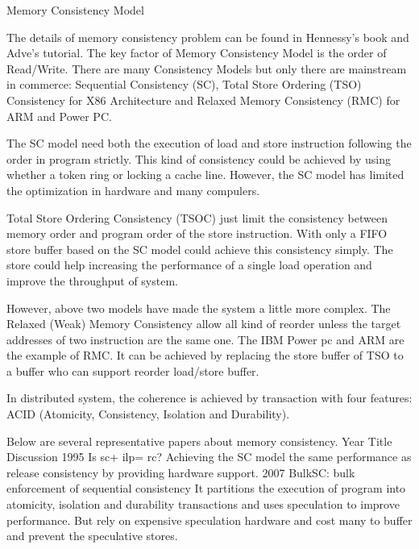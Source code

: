 \par Memory Consistency Model
\par The details of memory consistency problem can be found in Hennessy's book\cite{hennessy2017computer} and Adve's tutorial\cite{adve1996shared}. The key factor of Memory Consistency Model is the order of Read/Write. There are many Consistency Models but only there are mainstream in commerce: Sequential Consistency (SC), Total Store Ordering (TSO) Consistency for X86 Architecture\cite{owens2009better} and Relaxed Memory Consistency (RMC) for ARM and Power PC\cite{maranget2012tutorial}.
\par The SC model need both the execution of load and store instruction following the order in program strictly. This kind of consistency could be achieved by using whether a token ring or locking a cache line\cite{lamport1979make}. However, the SC model has limited the optimization in hardware and many compulers\cite{adve1996shared}\cite{boehm2008foundations}.
\par Total Store Ordering Consistency (TSOC) just limit the consistency between memory order and program order of the store instruction. With only a FIFO store buffer based on the SC model could achieve this consistency simply. The store could help increasing the performance of a single load operation and improve the throughput of system.
\par However, above two models have made the system a little more complex. The Relaxed (Weak) Memory Consistency allow all kind of reorder unless the target addresses of two instruction are the same one. The IBM Power pc and ARM are the example of RMC. It can be achieved by replacing the store buffer of TSO to a buffer who can support reorder load/store buffer.
\par In distributed system, the coherence is achieved by transaction with four features: ACID (Atomicity, Consistency, Isolation and Durability).
\par Below are several representative papers about memory consistency.
Year	Title 	Discussion 
1995\cite{guiady1999sc+}
Is sc+ ilp= rc?	Achieving the SC model the same performance as release consistency by providing hardware support.
2007\cite{ceze2007bulksc}
BulkSC: bulk enforcement of sequential consistency	It partitions the execution of program into atomicity, isolation and durability transactions and uses speculation to improve performance. But rely on expensive speculation hardware and cost many to buffer and prevent the speculative stores\cite{ceze2007bulksc}.


